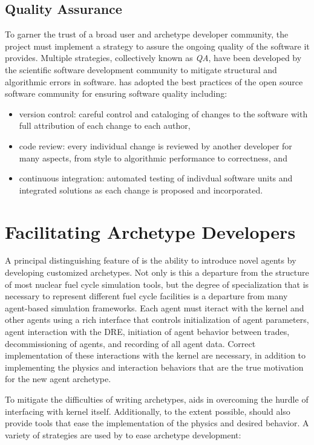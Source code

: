 \subsection{Quality Assurance}

To garner the trust of a broad user and archetype developer community, the
\Cyclus project must implement a strategy to assure the ongoing quality of the
software it provides.  Multiple strategies, collectively known as
\emph{\gls{QA}}, have been developed by the scientific software development
community to mitigate structural and algorithmic errors in software.  \Cyclus
has adopted the best practices of the open source software community for
ensuring software quality including:
\begin{itemize}
\item version control: careful control and cataloging of changes to the
  software with full attribution of each change to each author,
\item code review: every individual change is reviewed by another developer
  for many aspects, from style to algorithmic performance to correctness, and
\item continuous integration: automated testing of indivdual software units
  and integrated solutions as each change is proposed and incorporated.
\end{itemize}


\section{Facilitating Archetype Developers} %

A principal distinguishing feature of \Cyclus is the ability to introduce
novel agents by developing customized archetypes.  Not only is this a
departure from the structure of most nuclear fuel cycle simulation tools, but
the degree of specialization that is necessary to represent different fuel
cycle facilities is a departure from many agent-based simulation frameworks.
Each agent must iteract with the \Cyclus kernel and other agents using a rich
interface that controls initialization of agent parameters, agent interaction
with the \gls{DRE}, initiation of agent behavior between trades,
decommissioning of agents, and recording of all agent data.  Correct
implementation of these interactions with the kernel are necessary, in
addition to implementing the physics and interaction behaviors that are the
true motivation for the new agent archetype.

To mitigate the difficulties of writing archetypes, \Cyclus aids in overcoming
the hurdle of interfacing with kernel itself. Additionally, to the extent
possible, \Cyclus should also provide tools that ease the implementation of
the physics and desired behavior.  A variety of strategies are used by \Cyclus
to ease archetype development:

